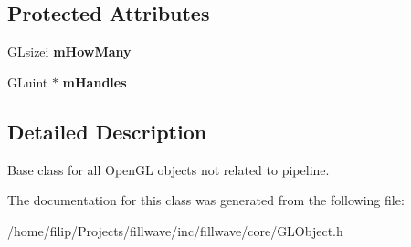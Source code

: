 \subsection*{Protected Attributes}
\begin{DoxyCompactItemize}
\item 
\hypertarget{classfillwave_1_1core_1_1GLObject_a005f281fe10e1af954695452528c2a8d}{}G\+Lsizei {\bfseries m\+How\+Many}\label{classfillwave_1_1core_1_1GLObject_a005f281fe10e1af954695452528c2a8d}

\item 
\hypertarget{classfillwave_1_1core_1_1GLObject_a44efc7a7b19fc7012fe582fe4e9c3cc0}{}G\+Luint $\ast$ {\bfseries m\+Handles}\label{classfillwave_1_1core_1_1GLObject_a44efc7a7b19fc7012fe582fe4e9c3cc0}

\end{DoxyCompactItemize}


\subsection{Detailed Description}
Base class for all Open\+G\+L objects not related to pipeline. 

The documentation for this class was generated from the following file\+:\begin{DoxyCompactItemize}
\item 
/home/filip/\+Projects/fillwave/inc/fillwave/core/G\+L\+Object.\+h\end{DoxyCompactItemize}
